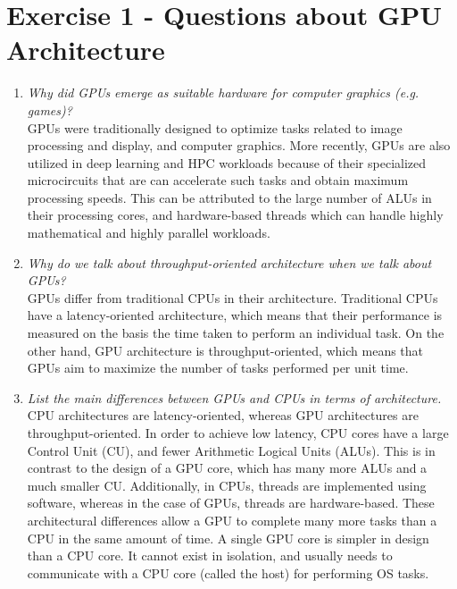 \documentclass[12pt]{article}
\begin{document}
\section{Exercise 1 - Questions about GPU Architecture}
\begin{enumerate}
    \item \textit{Why did GPUs emerge as suitable hardware for computer graphics (e.g. games)?}\\
    GPUs were traditionally designed to optimize tasks related to image processing and display, and computer graphics. More recently, GPUs are also utilized in deep learning and HPC workloads because of their specialized microcircuits that are can accelerate such tasks and obtain maximum processing speeds. This can be attributed to the large number of ALUs in their processing cores, and hardware-based threads which can handle highly mathematical and highly parallel workloads.
    
    \item \textit{Why do we talk about throughput-oriented architecture when we talk about GPUs?}\\
    GPUs differ from traditional CPUs in their architecture. Traditional CPUs have a latency-oriented architecture, which means that their performance is measured on the basis the time taken to perform an individual task. On the other hand, GPU architecture is throughput-oriented, which means that GPUs aim to maximize the number of tasks performed per unit time. 
    
    \item \textit{List the main differences between GPUs and CPUs in terms of architecture.}\\
    CPU architectures are latency-oriented, whereas GPU architectures are throughput-oriented. In order to achieve low latency, CPU cores have a large Control Unit (CU), and fewer Arithmetic Logical Units (ALUs). This is in contrast to the design of a GPU core, which has many more ALUs and a much smaller CU. Additionally, in CPUs, threads are implemented using software, whereas in the case of GPUs, threads are hardware-based. These architectural differences allow a GPU to complete many more tasks than a CPU in the same amount of time. A single GPU core is simpler in design than a CPU core. It cannot exist in isolation, and usually needs to communicate with a CPU core (called the host) for performing OS tasks. 
    

\end{enumerate}
\end{document}
